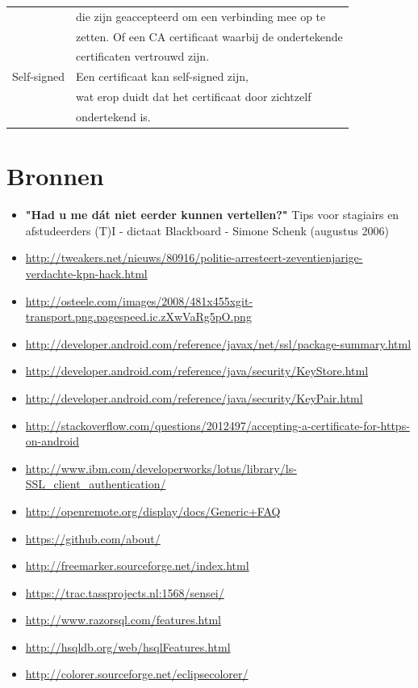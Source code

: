\documentclass[]{article}
\begin{document}
\begin{tabular}{|| l | l ||}
                     & die zijn geaccepteerd om een verbinding mee op te    \\
                     & zetten. Of een CA certificaat waarbij de ondertekende\\
                     & certificaten vertrouwd  zijn.                        \\\hline
    Self-signed      & Een certificaat kan self-signed zijn,                \\
                     & wat erop duidt dat het certificaat door zichtzelf    \\
                     & ondertekend is.                                      \\\hline
\end{tabular}

\newpage
\section{Bronnen}

\begin{itemize}
    \item \textbf{"Had u me d\'at niet eerder kunnen vertellen?"} Tips voor
    stagiairs en afstudeerders (T)I - dictaat Blackboard - Simone Schenk
    (augustus 2006) 

    \item \url{http://tweakers.net/nieuws/80916/politie-arresteert-zeventienjarige-verdachte-kpn-hack.html}
    \item \url{http://osteele.com/images/2008/481x455xgit-transport.png.pagespeed.ic.zXwVaRg5pO.png}
    \item \url{http://developer.android.com/reference/javax/net/ssl/package-summary.html}
    \item \url{http://developer.android.com/reference/java/security/KeyStore.html}
    \item \url{http://developer.android.com/reference/java/security/KeyPair.html}
    \item \url{http://stackoverflow.com/questions/2012497/accepting-a-certificate-for-https-on-android}
    \item \url{http://www.ibm.com/developerworks/lotus/library/ls-SSL_client_authentication/}
    \item \url{http://openremote.org/display/docs/Generic+FAQ}
    \item \url{https://github.com/about/}
    \item \url{http://freemarker.sourceforge.net/index.html}
    \item \url{https://trac.tassprojects.nl:1568/sensei/}
    \item \url{http://www.razorsql.com/features.html}
    \item \url{http://hsqldb.org/web/hsqlFeatures.html}
    \item \url{http://colorer.sourceforge.net/eclipsecolorer/}

\end{itemize}
\end{document}
